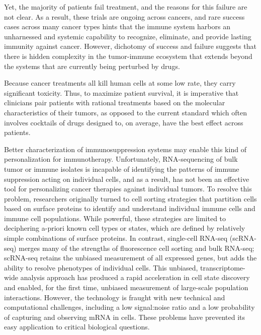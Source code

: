Yet, the majority of patients fail treatment, and the reasons for this failure are not clear.  
As a result, these trials are ongoing across cancers, and rare success cases across many cancer types hints that the immune system harbors an unharnessed and systemic capability to recognize, eliminate, and provide lasting immunity against cancer.
However, dichotomy of success and failure suggests that there is hidden complexity in the tumor-immune ecosystem that extends beyond the systems that are currently being perturbed by drugs.

Because cancer treatments all kill human cells at some low rate, they carry significant toxicity. 
Thus, to maximize patient survival, it is imperative that clinicians pair patients with rational treatments based on the molecular characteristics of their tumors, as opposed to the current standard which often involves cocktails of drugs designed to, on average, have the best effect across patients. 

Better characterization of immunosuppression systems may enable this kind of personalization for immunotherapy. 
Unfortunately, RNA-sequencing of bulk tumor or immune isolates is incapable of identifying the patterns of immune suppression acting on individual cells, and as a result, has not been an effective tool for personalizing cancer therapies against individual tumors.  
To resolve this problem, researchers originally turned to cell sorting strategies that partition cells based on surface proteins to identify and understand individual immune cells and immune cell populations.
While powerful, these strategies are limited to deciphering a-priori known cell types or states, which are defined by relatively simple combinations of surface proteins.
In contrast, single-cell RNA-seq (scRNA-seq) merges many of the strengths of fluorescence cell sorting and bulk RNA-seq; scRNA-seq retains the unbiased measurement of all expressed genes, but adds the ability to resolve phenotypes of individual cells.
This unbiased, transcriptome-wide analysis approach has produced a rapid acceleration in cell state discovery and enabled, for the first time, unbiased measurement of large-scale population interactions.
However, the technology is fraught with new technical and computational challenges, including a low signal:noise ratio and a low probability of capturing and observing mRNA in cells. 
These problems have prevented its easy application to critical biological questions.

